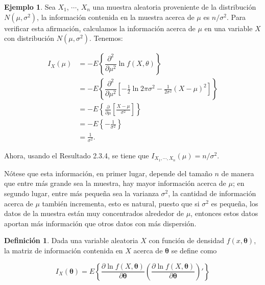 \documentclass[
  10pt,
  spanish,
]{book}
\theoremstyle{definition}
\newtheorem{definition}{Definición}[chapter]
\theoremstyle{definition}
\newtheorem{example}{Ejemplo}[chapter]
\theoremstyle{definition}
\theoremstyle{definition}
\theoremstyle{remark}
\begin{document}
\begin{example}
\protect\hypertarget{exm:unnamed-chunk-6}{}{\label{exm:unnamed-chunk-6} }Sea \(X_1\), \(\cdots\), \(X_n\) una muestra aleatoria proveniente de la distribución \(N(\mu,\sigma^2)\), la información contenida en la muestra acerca de \(\mu\) es \(n/\sigma^2\). Para verificar esta afirmación, calculamos la información acerca de \(\mu\) en una variable \(X\) con distribución \(N(\mu,\sigma^2)\). Tenemos:

\begin{align*}
I_X(\mu)&=-E\left\{\dfrac{\partial^2}{\partial\mu^2}\ln{f(X,\theta)}\right\}\\
        &=-E\left\{\dfrac{\partial^2}{\partial\mu^2}\left[-\frac{1}{2}\ln2\pi\sigma^2-\frac{1}{2\sigma^2}(X-\mu)^2\right]\right\}\\
        &=-E\left\{\frac{\partial}{\partial\mu}\left[\frac{X-\mu}{\sigma^2}\right]\right\}\\
        &=-E\left\{-\frac{1}{\sigma^2}\right\}\\
        &=\frac{1}{\sigma^2}.
\end{align*}

Ahora, usando el Resultado 2.3.4, se tiene que \(I_{X_1,\cdots,X_n}(\mu)=n/\sigma^2\).
\end{example}

Nótese que esta información, en primer lugar, depende del tamaño \(n\) de manera que entre más grande sea la muestra, hay mayor información acerca de \(\mu\); en segundo lugar, entre más pequeña sea la varianza \(\sigma^2\), la cantidad de información acerca de \(\mu\) también incrementa, esto es natural, puesto que si \(\sigma^2\) es pequeña, los datos de la muestra están muy concentrados alrededor de \(\mu\), entonces estos datos aportan más información que otros datos con más dispersión.

\begin{definition}
\protect\hypertarget{def:unnamed-chunk-7}{}{\label{def:unnamed-chunk-7} }Dada una variable aleatoria \(X\) con función de densidad \(f(x,\boldsymbol \theta)\), la matriz de información contenida en \(X\) acerca de \(\boldsymbol \theta\) se define como

\begin{equation}
I_X(\boldsymbol \theta)=E\left\{\frac{\partial\ln f(X,\boldsymbol \theta)}{\partial\boldsymbol \theta}\left(\frac{\partial\ln f(X,\boldsymbol \theta)}{\partial\boldsymbol \theta}\right)'\right\}
\end{equation}
\end{definition}
\end{document}
